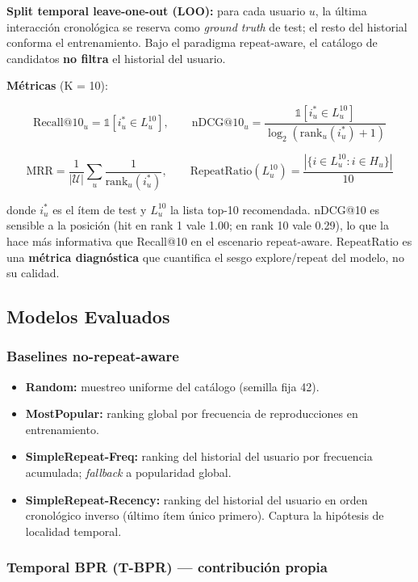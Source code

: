 \documentclass{article}
\providecommand{\tightlist}{%
  \setlength{\itemsep}{0pt}\setlength{\parskip}{0pt}}
\begin{document}
\textbf{Split temporal leave-one-out (LOO):} para cada usuario \(u\), la última interacción cronológica se reserva como \emph{ground truth} de test; el resto del historial conforma el entrenamiento. Bajo el paradigma repeat-aware, el catálogo de candidatos \textbf{no filtra} el historial del usuario.

\textbf{Métricas} (K = 10):

\[
\text{Recall@10}_u = \mathbb{1}[i_u^* \in L_u^{10}], \qquad
\text{nDCG@10}_u = \frac{\mathbb{1}[i_u^* \in L_u^{10}]}{\log_2(\text{rank}_u(i_u^*) + 1)}
\]

\[
\text{MRR} = \frac{1}{|\mathcal{U}|}\sum_u \frac{1}{\text{rank}_u(i_u^*)}, \qquad
\text{RepeatRatio}(L_u^{10}) = \frac{|\{i \in L_u^{10}: i \in H_u\}|}{10}
\]

donde \(i_u^*\) es el ítem de test y \(L_u^{10}\) la lista top-10 recomendada. nDCG@10 es sensible a la posición (hit en rank 1 vale 1.00; en rank 10 vale 0.29), lo que la hace más informativa que Recall@10 en el escenario repeat-aware. RepeatRatio es una \textbf{métrica diagnóstica} que cuantifica el sesgo explore/repeat del modelo, no su calidad.

\subsection{Modelos Evaluados}\label{modelos-evaluados}

\subsubsection{Baselines no-repeat-aware}\label{baselines-no-repeat-aware}

\begin{itemize}
\tightlist
\item
  \textbf{Random:} muestreo uniforme del catálogo (semilla fija 42).
\item
  \textbf{MostPopular:} ranking global por frecuencia de reproducciones en entrenamiento.
\item
  \textbf{SimpleRepeat-Freq:} ranking del historial del usuario por frecuencia acumulada; \emph{fallback} a popularidad global.
\item
  \textbf{SimpleRepeat-Recency:} ranking del historial del usuario en orden cronológico inverso (último ítem único primero). Captura la hipótesis de localidad temporal.
\end{itemize}

\subsubsection{Temporal BPR (T-BPR) --- contribución propia}\label{temporal-bpr-t-bpr-contribuciuxf3n-propia}
\end{document}
